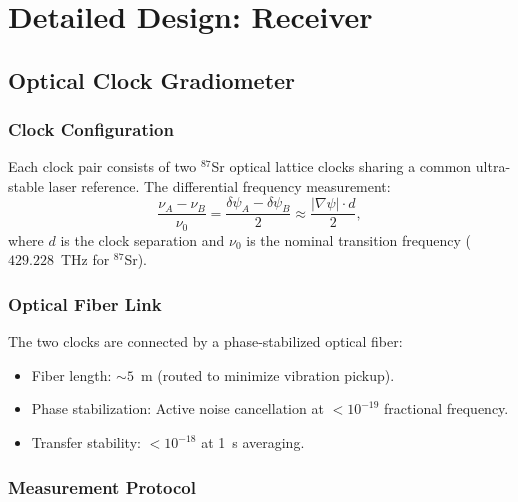 \documentclass[11pt,onecolumn]{article}
\begin{document}
\section{Detailed Design: Receiver}

\subsection{Optical Clock Gradiometer}

\subsubsection{Clock Configuration}

Each clock pair consists of two $^{87}$Sr optical lattice clocks
sharing a common ultra-stable laser reference.
The differential frequency measurement:
\begin{equation}
\frac{\nu_A - \nu_B}{\nu_0} = \frac{\delta\psi_A - \delta\psi_B}{2}
\approx \frac{|\nabla\psi| \cdot d}{2},
\end{equation}
where $d$ is the clock separation and $\nu_0$ is the nominal transition
frequency ($429.228$~THz for $^{87}$Sr).

\subsubsection{Optical Fiber Link}

The two clocks are connected by a phase-stabilized optical fiber:
\begin{itemize}
\item Fiber length: $\sim 5$~m (routed to minimize vibration pickup).
\item Phase stabilization: Active noise cancellation at $< 10^{-19}$
fractional frequency.
\item Transfer stability: $< 10^{-18}$ at 1~s averaging.
\end{itemize}

\subsubsection{Measurement Protocol}
\end{document}
